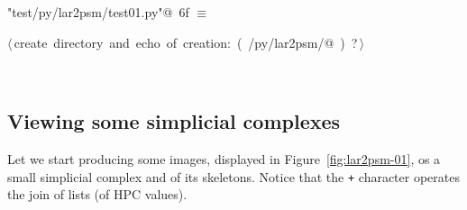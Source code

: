 \documentclass[11pt,oneside]{article}	%
\begin{document}
\begin{flushleft} \small
\begin{minipage}{\linewidth} \label{scrap19}
\protect{}\verb@"test/py/lar2psm/test01.py"@\nobreak\ {\footnotesize 6f }$\equiv$
\vspace{-1ex}
\begin{list}{}{} \item
\mbox{}\verb@@\hbox{$\langle\,$create directory and echo of creation:\nobreak\ ({\footnotesize {}\label{scrap20}
 }\mbox{}\verb@test/py/lar2psm/@ ) {\footnotesize ?}$\,\rangle$}\verb@@\\
\mbox{}\verb@@{\NWsep}
\end{list}
\vspace{-2ex}
\end{minipage}\\[4ex]
\end{flushleft}


\subsection{Viewing some simplicial complexes}
Let we start producing some images, displayed in Figure~\ref{fig:lar2psm-01}, os a small simplicial complex and of its skeletons. Notice that the \texttt{+} character operates the join of lists (of HPC values).
\end{document}
